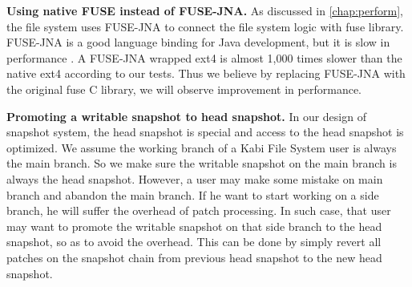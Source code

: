     \textbf{Using native FUSE instead of FUSE-JNA.} As discussed in \cref{chap:perform}, the file system uses FUSE-JNA to connect the file system logic with fuse library. FUSE-JNA is a good language binding for Java development, but it is slow in performance \cite{fusejna}. A FUSE-JNA wrapped ext4 is almost 1,000 times slower than the native ext4 according to our tests. Thus we believe by replacing FUSE-JNA with the original fuse C library, we will observe improvement in performance.

    \textbf{Promoting a writable snapshot to head snapshot.} In our design of snapshot system, the head snapshot is special and access to the head snapshot is optimized. We assume the working branch of a Kabi File System user is always the main branch. So we make sure the writable snapshot on the main branch is always the head snapshot. However, a user may make some mistake on main branch and abandon the main branch. If he want to start working on a side branch, he will suffer the overhead of patch processing. In such case, that user may want to promote the writable snapshot on that side branch to the head snapshot, so as to avoid the overhead. This can be done by simply revert all patches on the snapshot chain from previous head snapshot to the new head snapshot.
